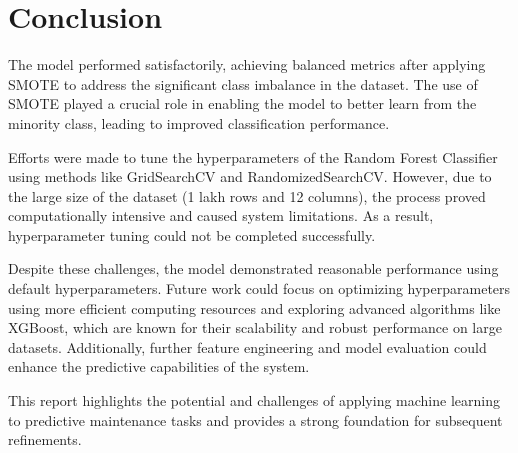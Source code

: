 	\section{Conclusion}
	The model performed satisfactorily, achieving balanced metrics after applying SMOTE to address the significant class imbalance in the dataset. The use of SMOTE played a crucial role in enabling the model to better learn from the minority class, leading to improved classification performance.
	
	Efforts were made to tune the hyperparameters of the Random Forest Classifier using methods like GridSearchCV and RandomizedSearchCV. However, due to the large size of the dataset (1 lakh rows and 12 columns), the process proved computationally intensive and caused system limitations. As a result, hyperparameter tuning could not be completed successfully.
	
	Despite these challenges, the model demonstrated reasonable performance using default hyperparameters. Future work could focus on optimizing hyperparameters using more efficient computing resources and exploring advanced algorithms like XGBoost, which are known for their scalability and robust performance on large datasets. Additionally, further feature engineering and model evaluation could enhance the predictive capabilities of the system.
	
	This report highlights the potential and challenges of applying machine learning to predictive maintenance tasks and provides a strong foundation for subsequent refinements.
